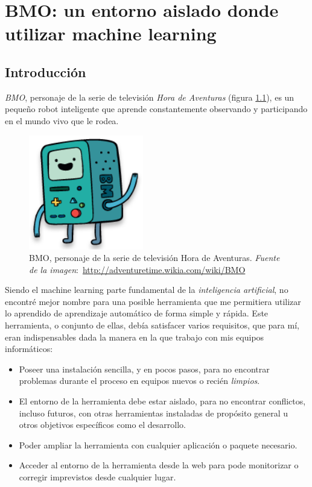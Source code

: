 \chapter{BMO: un entorno aislado donde utilizar machine learning} \label{chap:4}

\vspace*{5mm}

\section{Introducción} \label{sec:4.1}

\emph{BMO}, personaje de la serie de televisión \emph{Hora de Aventuras} (figura \ref{fig:4.1}), es un pequeño robot inteligente que aprende constantemente observando y participando en el mundo vivo que le rodea.

\begin{figure}[ht]
  \centering
  \includegraphics[width=50mm]{figures/ch_04/bmo_adventure_time.png}
  \caption{BMO, personaje de la serie de televisión Hora de Aventuras. \emph{Fuente de la imagen}:~\url{http://adventuretime.wikia.com/wiki/BMO}}
  \label{fig:4.1}
\end{figure}

Siendo el machine learning parte fundamental de la \emph{inteligencia artificial}, no encontré mejor nombre para una posible herramienta que me permitiera utilizar lo aprendido de aprendizaje automático de forma simple y rápida. Este herramienta, o conjunto de ellas, debía satisfacer varios requisitos, que para mí, eran indispensables dada la manera en la que trabajo con mis equipos informáticos:

\begin{itemize}
\item[\textbullet] Poseer una instalación sencilla, y en pocos pasos, para no encontrar problemas durante el proceso en equipos nuevos o recién \emph{limpios}.

\item[\textbullet] El entorno de la herramienta debe estar aislado, para no encontrar conflictos, incluso futuros, con otras herramientas instaladas de propósito general u otros objetivos específicos como el desarrollo.

\item[\textbullet] Poder ampliar la herramienta con cualquier aplicación o paquete necesario.

\item[\textbullet] Acceder al entorno de la herramienta desde la web para pode monitorizar o corregir imprevistos desde cualquier lugar.
\end{itemize}


